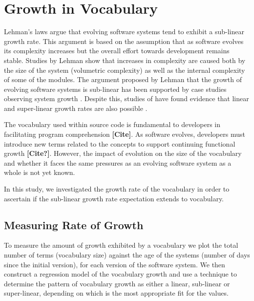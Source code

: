 \section{Growth in Vocabulary} %
\label{sec:growth_in_vocabulary}

Lehman's laws argue that evolving software systems tend to exhibit a sub-linear growth rate. This argument is based on the assumption that as software evolves its complexity increases but the overall effort towards development remains stable. Studies by Lehman \cite{Lehman97a} show that increases in complexity are caused both by the size of the system (volumetric complexity) as well as the internal complexity of some of the modules. The argument proposed by Lehman that the growth of evolving software systems is sub-linear has been supported by case studies observing system growth \cite{DAmbros07a, Gall97a, Lehman97a}. Despite this, studies of {\OSYS} have found evidence that linear and super-linear growth rates are also possible \cite{Godfrey01a,Israeli09a,Succi01a}.

The vocabulary used within source code is fundamental to developers in facilitating program comprehension \textbf{[Cite]}. As software evolves, developers must introduce new terms related to the concepts to support continuing functional growth \textbf{[Cite?]}. However, the impact of evolution on the size of the vocabulary and whether it faces the same pressures as an evolving software system as a whole is not yet known.

In this study, we investigated the growth rate of the vocabulary in order to ascertain if the sub-linear growth rate expectation extends to vocabulary.

\subsection{Measuring Rate of Growth} %
\label{sub:measuring_growth_in_vocabulary}


To measure the amount of growth exhibited by a vocabulary we plot the total number of terms (\ie vocabulary size) against the age of the systems (\ie number of days since the initial version), for each version of the software system. We then construct a regression model of the vocabulary growth and use a technique \cite{Draper98a} to determine the pattern of vocabulary growth as either a linear, sub-linear or super-linear, depending on which is the most appropriate fit for the values.

